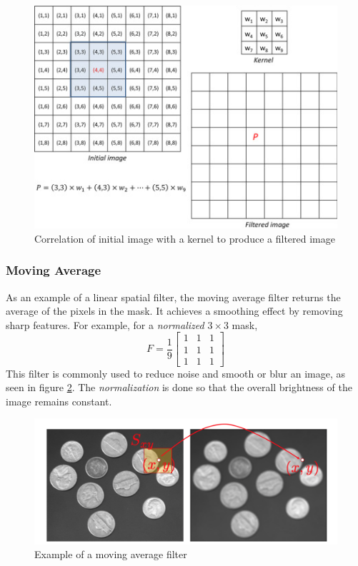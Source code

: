 \documentclass[twoside]{article}
\begin{document}
\begin{figure}[h]
  \centering
  \includegraphics[scale=.8]{filter.jpg}
    \caption{Correlation of initial image with a kernel to produce a filtered image}
    \label{correlation}
\end{figure}


\subsubsection{Moving Average}
As an example of a linear spatial filter, the moving average filter returns the average of the pixels in the mask. It achieves a smoothing effect by removing sharp features. For example, for a \textit{normalized} $3\times3$ mask,
\[
F = \frac{1}{9}
\begin{bmatrix}
1 & 1 & 1\\
1 & 1 & 1\\
1 & 1 & 1
\end{bmatrix}
\]
This filter is commonly used to reduce noise and smooth or blur an image, as seen in figure \ref{movag}. The \textit{normalization} is done so that the overall brightness of the image remains constant. 
\begin{figure}[h]
  \centering
  \includegraphics[scale=.4]{blur.png}
    \caption{Example of a moving average filter}
    \label{movag}
\end{figure}
\end{document}
